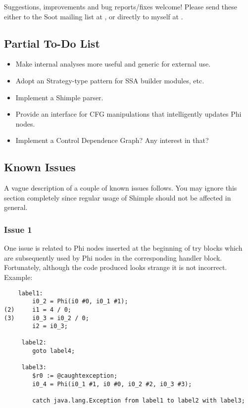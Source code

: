 \documentclass[10pt,letterpaper,oneside,onecolumn]{article}
\begin{document}
Suggestions, improvements and bug reports/fixes welcome!  Please send
these either to the Soot mailing list at
, or directly to myself
at
.

\subsection{Partial To-Do List}

\begin{itemize}
\item Make internal analyses more useful and generic for external use.
\item Adopt an Strategy-type pattern for SSA builder modules, etc.
\item Implement a Shimple parser.
\item Provide an interface for CFG manipulations that intelligently 
updates Phi nodes.
\item Implement a Control Dependence Graph?  Any interest in that?
\end{itemize}

\subsection{Known Issues}

A vague description of a couple of known issues follows.  You may
ignore this section completely since regular usage of Shimple should
not be affected in general.

\subsubsection{Issue 1}

One issue is related to Phi nodes inserted at the beginning of try
blocks which are subsequently used by Phi nodes in the corresponding
handler block.  Fortunately, although the code produced looks strange
it is not incorrect.  Example:

\begin{verbatim}
    label1:
        i0_2 = Phi(i0 #0, i0_1 #1);
(2)     i1 = 4 / 0;
(3)     i0_3 = i0_2 / 0;
        i2 = i0_3;

     label2:
        goto label4;

     label3:
        $r0 := @caughtexception;
        i0_4 = Phi(i0_1 #1, i0 #0, i0_2 #2, i0_3 #3);

        catch java.lang.Exception from label1 to label2 with label3;
\end{verbatim}
\end{document}

